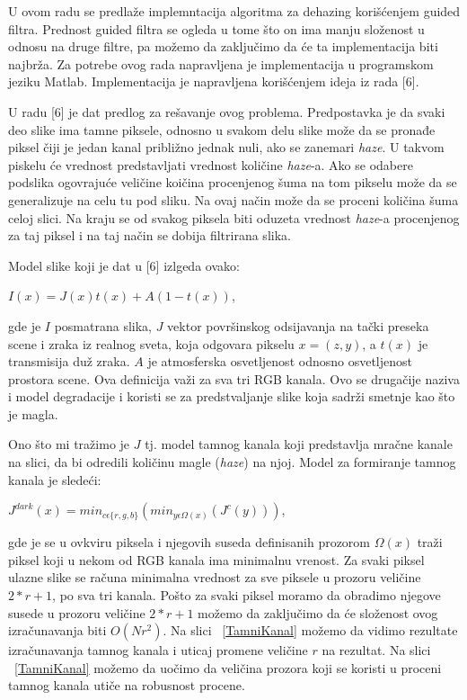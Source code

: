 \documentclass[a4paper,12pt,titlepage]{article}
\begin{document}
U ovom radu se predlaže implemntacija algoritma za dehazing korišćenjem guided filtra. Prednost guided filtra se ogleda u tome što on ima manju složenost u odnosu na druge filtre, pa možemo da zaključimo da će ta implementacija biti najbrža. Za potrebe ovog rada napravljena je implementacija u programskom jeziku Matlab. Implementacija je napravljena korišćenjem ideja iz rada [6]. 

U radu [6] je dat predlog za rešavanje ovog problema. Predpostavka je da svaki deo slike ima tamne piksele, odnosno u svakom delu slike može da se pronađe piksel čiji je jedan kanal približno jednak nuli, ako se zanemari \emph{haze}. U takvom piskelu će vrednost predstavljati vrednost količine \emph{haze}-a. Ako se odabere podslika ogovrajuće veličine koičina procenjenog šuma na tom pikselu može da se generalizuje na celu tu pod sliku. Na ovaj način može da se proceni količina šuma celoj slici. Na kraju se od svakog piksela biti oduzeta vrednost \emph{haze}-a procenjenog za taj piksel i na taj način se dobija filtrirana slika.

Model slike koji je dat u [6] izlgeda ovako:

\begin{center}
$I(x) = J(x)t(x) + A(1 - t(x))$,
\end{center}

gde je $I$ posmatrana slika, $J$ vektor površinskog odsijavanja na tački preseka scene i zraka iz realnog sveta, koja odgovara pikselu $x = (z, y)$, a $t(x)$ je transmisija duž zraka. $A$ je atmosferska osvetljenost odnosno osvetljenost prostora scene. Ova definicija važi za sva tri RGB kanala. Ovo se drugačije naziva i model degradacije i koristi se za predstvaljanje slike koja sadrži smetnje kao što je magla.   

Ono što mi tražimo je $J$ tj. model tamnog kanala koji predstavlja mračne kanale na slici, da bi odredili količinu magle (\emph{haze}) na njoj. Model za formiranje tamnog kanala je sledeći:

\begin{center}
$J^{dark}(x) = min_{c \epsilon \{r, g, b \}}( min_{y \epsilon \Omega (x)} (J^c (y)) )$,
\end{center}

gde je se u ovkviru piksela i njegovih suseda definisanih prozorom $\Omega(x)$ traži piksel koji u nekom od RGB kanala ima minimalnu vrenost. Za svaki piksel ulazne slike se računa minimalna vrednost za sve piksele u prozoru veličine $2*r + 1$, po sva tri kanala. Pošto za svaki piksel moramo da obradimo njegove susede u prozoru veličine $2*r + 1$ možemo da zaključimo da će složenost ovog izračunavanja biti $O(Nr^2)$. Na slici ~\ref{TamniKanal} možemo da vidimo rezultate izračunavanja tamnog kanala i uticaj promene veličine $r$ na rezultat. Na slici ~\ref{TamniKanal} možemo da uočimo da veličina prozora koji se koristi u proceni tamnog kanala utiče na robusnost procene. 
\end{document}
